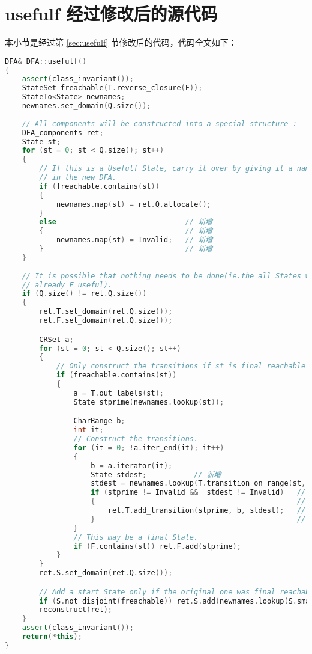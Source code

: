 \section{usefulf 经过修改后的源代码}

本小节是经过第 \ref{sec:usefulf} 节修改后的代码，代码全文如下：

\begin{lstlisting}[language=C++,label={lst:usefulf-fix},caption={文件 DFA.cpp}]
DFA& DFA::usefulf()
{
	assert(class_invariant());
	StateSet freachable(T.reverse_closure(F));
	StateTo<State> newnames;
	newnames.set_domain(Q.size());
	
	// All components will be constructed into a special structure :
	DFA_components ret;
	State st;
	for (st = 0; st < Q.size(); st++)
	{
		// If this is a Usefulf State, carry it over by giving it a name
		// in the new DFA.
		if (freachable.contains(st))
		{
			newnames.map(st) = ret.Q.allocate();
		}
		else                              // 新增
		{                                 // 新增
			newnames.map(st) = Invalid;   // 新增
		}                                 // 新增
    }
    
	// It is possible that nothing needs to be done(ie.the all States were
	// already F useful).
	if (Q.size() != ret.Q.size())
	{
		ret.T.set_domain(ret.Q.size());
		ret.F.set_domain(ret.Q.size());

		CRSet a;
		for (st = 0; st < Q.size(); st++)
		{
			// Only construct the transitions if st is final reachable.
			if (freachable.contains(st))
			{
				a = T.out_labels(st);
				State stprime(newnames.lookup(st));

				CharRange b;
				int it;
				// Construct the transitions.
				for (it = 0; !a.iter_end(it); it++)
				{
					b = a.iterator(it);
					State stdest;           // 新增
					stdest = newnames.lookup(T.transition_on_range(st, b));  // 新增
					if (stprime != Invalid &&  stdest != Invalid)   // 新增
					{                                               // 新增 
						ret.T.add_transition(stprime, b, stdest);   // 修改
					}                                               // 新增
				}
				// This may be a final State.
				if (F.contains(st)) ret.F.add(stprime);
			}
		}
		ret.S.set_domain(ret.Q.size());

		// Add a start State only if the original one was final reachable.
		if (S.not_disjoint(freachable)) ret.S.add(newnames.lookup(S.smallest()));
		reconstruct(ret);
	}
	assert(class_invariant());
	return(*this);
}
\end{lstlisting}


